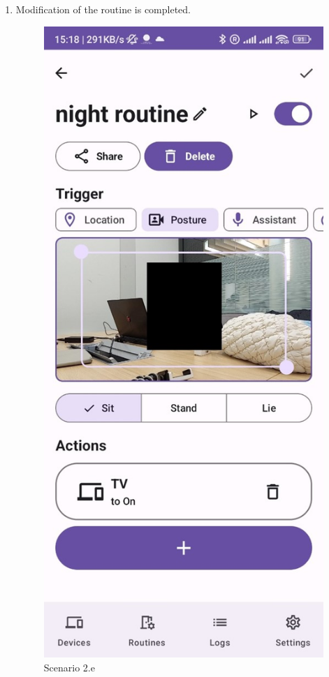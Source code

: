 \begin{enumerate}
\begin{enumerate}
        \item Modification of the routine is completed. \\
        \begin{figure}
            \centering
            \includegraphics[width=0.5\linewidth]{imgs//usercase/scnario2-2.jpg}
            \caption{Scenario 2.e}
            \label{fig:enter-label}
        \end{figure}
    \end{enumerate}


\end{enumerate}
